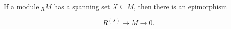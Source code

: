 If a module $_R M$ has a spanning set $X \subseteq M$, then there is an epimorphism

$$R^{(X)} \rightarrow M \rightarrow 0.$$
